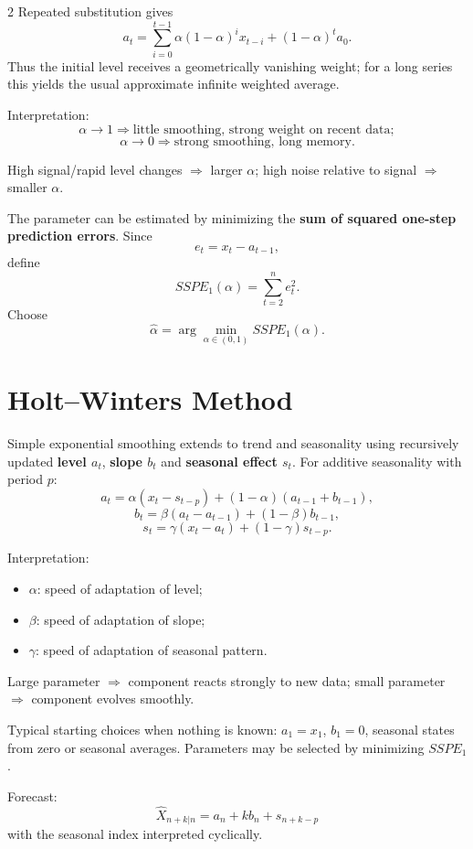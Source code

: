\documentclass[9pt,a4paper]{extarticle}
\newcommand{\key}[1]{\textbf{#1}}
\begin{document}
\begin{multicols}{2}
Repeated substitution gives
\[
a_t=\sum_{i=0}^{t-1}\alpha(1-\alpha)^i x_{t-i}+(1-\alpha)^t a_0.
\]
Thus the initial level receives a geometrically vanishing weight; for a long series this yields the usual approximate infinite weighted average.

Interpretation:
\[
\alpha\to1
\Rightarrow
\text{little smoothing, strong weight on recent data};
\]
\[
\alpha\to0
\Rightarrow
\text{strong smoothing, long memory}.
\]

High signal/rapid level changes \(\Rightarrow\) larger \(\alpha\); high noise relative to signal \(\Rightarrow\) smaller \(\alpha\).

The parameter can be estimated by minimizing the \key{sum of squared one-step prediction errors}. Since
\[
e_t=x_t-a_{t-1},
\]
define
\[
\boxed{
SSPE_1(\alpha)=\sum_{t=2}^{n}e_t^2.
}
\]
Choose
\[
\boxed{\widehat\alpha=\arg\min_{\alpha\in(0,1)}SSPE_1(\alpha).}
\]

\section{Holt--Winters Method}

Simple exponential smoothing extends to trend and seasonality using recursively updated \key{level \(a_t\)}, \key{slope \(b_t\)} and \key{seasonal effect \(s_t\)}. For additive seasonality with period \(p\):
\[
\boxed{
a_t=
\alpha(x_t-s_{t-p})
+(1-\alpha)(a_{t-1}+b_{t-1}),
}
\]
\[
\boxed{
b_t=
\beta(a_t-a_{t-1})
+(1-\beta)b_{t-1},
}
\]
\[
\boxed{
s_t=
\gamma(x_t-a_t)
+(1-\gamma)s_{t-p}.
}
\]

Interpretation:
\begin{itemize}
\item \(\alpha\): speed of adaptation of level;
\item \(\beta\): speed of adaptation of slope;
\item \(\gamma\): speed of adaptation of seasonal pattern.
\end{itemize}

Large parameter \(\Rightarrow\) component reacts strongly to new data; small parameter \(\Rightarrow\) component evolves smoothly.

Typical starting choices when nothing is known: \(a_1=x_1\), \(b_1=0\), seasonal states from zero or seasonal averages. Parameters may be selected by minimizing \(SSPE_1\).

Forecast:
\[
\boxed{
\widehat X_{n+k|n}
=
a_n+kb_n+s_{n+k-p}
}
\]
with the seasonal index interpreted cyclically.


\end{multicols}
\end{document}
